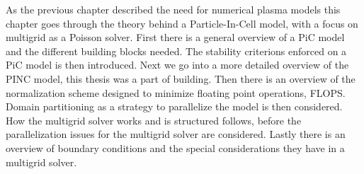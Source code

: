 
As the previous chapter described the need for numerical plasma models this chapter
goes through the theory behind a Particle-In-Cell model, with a focus on
multigrid as a Poisson solver.
First there is a general overview of a PiC model and the different building blocks
needed. The stability criterions enforced on a PiC model is then introduced.
Next we go into a more detailed overview of the PINC model, this thesis was a part of
building.
Then there is an overview of the normalization scheme designed to minimize
floating point operations, FLOPS. Domain partitioning as a strategy to parallelize
the model is then considered. How the multigrid solver works and is structured follows,
before the parallelization issues for the multigrid solver are considered.
Lastly there is an overview of boundary conditions and the special considerations
they have in a multigrid solver.
